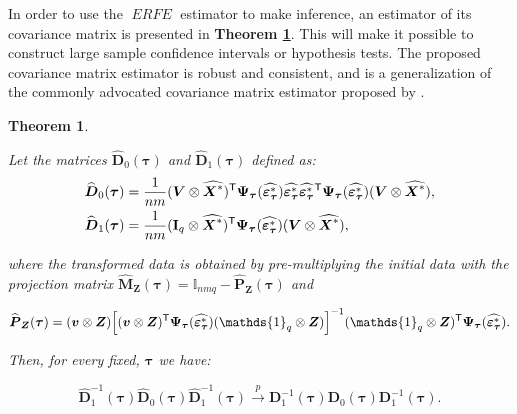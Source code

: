 \documentclass[15pt,a4paper]{article}
\newcommand{\transpose}{{}^{\text{\sffamily T}}}
\DeclareMathOperator{\ERFE}{\textit{ERFE}}
\newtheorem{theorem}{Theorem}%
\begin{document}
In order to use the $\ERFE$ estimator to make inference, an estimator of its covariance matrix is presented in \textbf{Theorem \ref{theo3_erfe}}. This will make it possible to construct large sample confidence intervals or hypothesis tests. The proposed covariance matrix estimator is robust and consistent, and is a generalization of the commonly advocated covariance matrix estimator proposed by \citet{White1980}.

\begin{theorem}\label{theo3_erfe}

Let the matrices $\widehat{\boldsymbol{D}}_0(\boldsymbol{\tau})$ and $\widehat{\boldsymbol{D}}_1(\boldsymbol{\tau})$ defined as:
\begin{align*}
    \begin{split}
        {}& \widehat{\boldsymbol{D}}_0(\boldsymbol{\tau})=\frac{1}{nm}(\boldsymbol{V}\otimes\widehat{ \boldsymbol{X}^{*}})\transpose\boldsymbol{\Psi}_{\boldsymbol{\tau}}(\widehat{\boldsymbol{\varepsilon}_{\boldsymbol{\tau}}^{*}})
        \widehat{\boldsymbol{\varepsilon}_{\boldsymbol{\tau}}^{*}}\widehat{\boldsymbol{\varepsilon}_{\boldsymbol{\tau}}^{*}}\transpose
        \boldsymbol{\Psi}_{\boldsymbol{\tau}}(\widehat{\boldsymbol{\varepsilon}_{\boldsymbol{\tau}}^{*}}) (\boldsymbol{V}\otimes\widehat{\boldsymbol{X}^{*}}), \\
        {}& \widehat{\boldsymbol{D}}_1(\boldsymbol{\tau})=\frac{1}{nm}(\mathbf{I}_q\otimes\widehat{\boldsymbol{X}^{*}})\transpose\boldsymbol{\Psi}_{\boldsymbol{\tau}}(\widehat{\boldsymbol{\varepsilon}_{\boldsymbol{\tau}}^{*}})(\boldsymbol{V}
        \otimes\widehat{\boldsymbol{X}^{*}}),
    \end{split}
\end{align*}

where the transformed data is obtained by pre-multiplying the initial data with the projection matrix $\widehat{\boldsymbol{M}}_{\boldsymbol{Z}}(\boldsymbol{\tau})=\mathbb{I}_{nmq}-\widehat{\boldsymbol{P}}_{\boldsymbol{Z}}
(\boldsymbol{\tau})$ and

\begin{equation*}
    \widehat{\boldsymbol{P}}_{\boldsymbol{Z}}(\boldsymbol{\tau})=(\boldsymbol{v}\otimes\boldsymbol{Z})
\Big[(\boldsymbol{v}\otimes\boldsymbol{Z})\transpose  \boldsymbol{\Psi}_{\boldsymbol{\tau}}(\widehat{\boldsymbol{\varepsilon}_{\boldsymbol{\tau}}^{*}})
(\mathds{1}_q\otimes\boldsymbol{Z})\Big]^{-1}(\mathds{1}_q\otimes\boldsymbol{Z})\transpose \boldsymbol{\Psi}_{\boldsymbol{\tau}}(\widehat{\boldsymbol{\varepsilon}_{\boldsymbol{\tau}}^{*}}).
\end{equation*}

Then, for every fixed, $\boldsymbol{\tau}$ we have:

\begin{equation*}
  \widehat{\boldsymbol{D}}_1^{-1}(\boldsymbol{\tau}) \widehat{\boldsymbol{D}}_0(\boldsymbol{\tau}) \widehat{\boldsymbol{D}}_1^{-1}(\boldsymbol{\tau})
  \xrightarrow{p} 
  \boldsymbol{D}_1^{-1}(\boldsymbol{\tau}) \boldsymbol{D}_0(\boldsymbol{\tau})\boldsymbol{D}_1^{-1}(\boldsymbol{\tau}).
\end{equation*}
\end{theorem}
\end{document}
